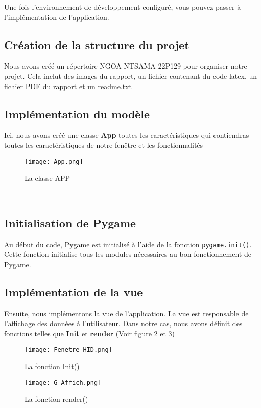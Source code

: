 \documentclass[12pt,a4paper]{report}
\begin{document}
Une fois l'environnement de développement configuré, vous pouvez passer à l'implémentation de l'application.

\subsection{Création de la structure du projet}
Nous avons créé un répertoire NGOA NTSAMA 22P129 pour organiser notre projet. Cela inclut des images du rapport, un fichier contenant du code latex, un fichier PDF du rapport et un readme.txt

\subsection{Implémentation du modèle}
Ici, nous avons créé une classe {\bfseries App} toutes les caractéristiques qui contiendras toutes les caractéristiques de notre fenêtre et les fonctionnalités 
\begin{figure}[h]
    \centering
    \texttt{[image: App.png]}
    \caption{La classe APP}
    \label{fig:exemple}
\end{figure}
\\

\subsection{Initialisation de Pygame}

Au début du code, Pygame est initialisé à l'aide de la fonction \texttt{pygame.init()}. Cette fonction initialise tous les modules nécessaires au bon fonctionnement de Pygame.


\subsection{Implémentation de la vue}
Ensuite, nous implémentons la vue de l'application. La vue est responsable de l'affichage des données à l'utilisateur. Dans notre cas, nous avons définit des fonctions telles que {\bfseries Init} et {\bfseries render} (Voir figure 2 et 3)
\begin{figure}[h]
    \centering
    \texttt{[image: Fenetre HID.png]}
    \caption{La fonction Init()}
    \label{fig:exemple}
\end{figure}

\begin{figure}[h]
    \centering
    \texttt{[image: G\_Affich.png]}
    \caption{La fonction render()}
    \label{fig:exemple}
\end{figure}
\end{document}

